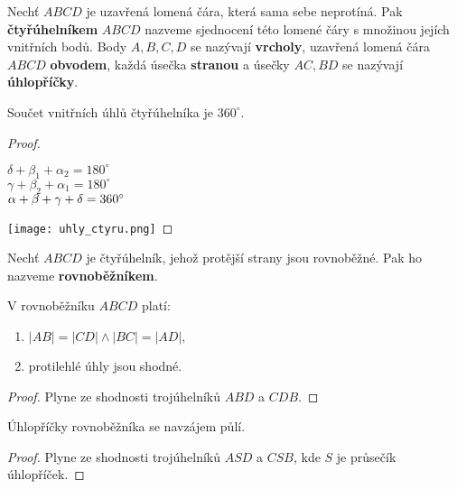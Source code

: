 \begin{definition}
  Nechť $ABCD$ je uzavřená lomená čára, která sama sebe neprotíná. Pak \textbf{čtyřúhelníkem} $ABCD$ nazveme sjednocení této lomené čáry s množinou jejích vnitřních bodů. Body $A,B,C,D$ se nazývají \textbf{vrcholy}, uzavřená lomená čára $ABCD$ \textbf{obvodem}, každá úsečka \textbf{stranou} a úsečky $AC,BD$ se nazývají \textbf{úhlopříčky}.
\end{definition}

\begin{veta}
  Součet vnitřních úhlů čtyřúhelníka je $360^\circ$.
\end{veta}

\begin{proof}
  \,
  \begin{minipage}{0.5\textwidth}
    $\delta+ \beta_1+ \alpha_2 = 180^\circ$\\
    $\gamma + \beta_2 + \alpha_1 = 180^\circ$\\
    $\alpha+\beta+\gamma+\delta=360^\circ\qedhere$
  \end{minipage}
  \hfill
  \noindent\begin{minipage}{0.5\textwidth}
    \centering
    \texttt{[image: uhly\_ctyru.png]}
  \end{minipage}

\end{proof}

\begin{definition}
  Nechť $ABCD$ je čtyřúhelník, jehož protější strany jsou rovnoběžné. Pak ho nazveme \textbf{rovnoběžníkem}.
\end{definition}

\begin{veta}
  V rovnoběžníku $ABCD$ platí:
  \begin{enumerate}[$i.$]
    \item $|AB|=|CD| \land |BC|=|AD|,$
    \item protilehlé úhly jsou shodné.
  \end{enumerate}
\end{veta}

\begin{proof}
  Plyne ze shodnosti trojúhelníků $ABD$ a $CDB.$
\end{proof}

\begin{veta}
  Úhlopříčky rovnoběžníka se navzájem půlí.
\end{veta}


\begin{proof}
  Plyne ze shodnosti trojúhelníků $ASD$ a $CSB$, kde $S$ je průsečík úhlopříček.
\end{proof}

